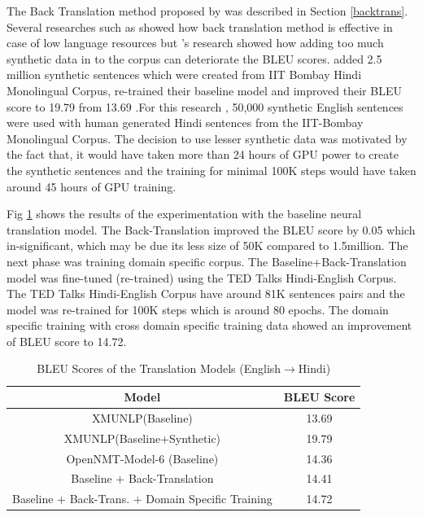 The Back Translation method proposed by \cite{DBLP:journals/corr/SennrichHB15a} was described in Section \ref{backtrans}. Several researches such as \cite{W18-2703} showed how back translation method is effective in case of low language resources but \cite{DBLP:journals/corr/abs-1804-06189}'s research showed how adding too much synthetic data in to the corpus  can deteriorate the BLEU scores.\cite{W17-5707} added 2.5 million synthetic sentences which were created from IIT Bombay Hindi Monolingual Corpus, re-trained their baseline model and improved their BLEU score to 19.79 from 13.69 .For this research , 50,000 synthetic English sentences were used with human generated Hindi sentences from the IIT-Bombay Monolingual Corpus. The decision to use lesser synthetic data was motivated by the fact that, it would have taken more than 24 hours of GPU power to create the synthetic sentences and the training for minimal 100K steps would have taken around 45 hours of GPU training.

Fig \ref{bleutable2} shows the results of the experimentation with the baseline neural translation model. The Back-Translation improved the BLEU score by 0.05 which in-significant, which may be due its less size of 50K compared to 1.5million. The next phase was training domain specific corpus. The Baseline+Back-Translation model was fine-tuned (re-trained) using the TED Talks Hindi-English Corpus. The TED Talks Hindi-English Corpus have around 81K sentences pairs and the model was re-trained for 100K steps which is around 80 epochs. The domain specific training with cross domain specific training data showed an improvement of BLEU score to 14.72.

\begin{table}[h!]
\centering
 \begin{tabular}{ |c|c| } 
  \hline Model & BLEU Score  \\ 
  \hline  XMUNLP(Baseline) &   13.69\\
  XMUNLP(Baseline+Synthetic) &   19.79\\
  \hline  OpenNMT-Model-6 (Baseline) &   14.36\\
  Baseline + Back-Translation & 14.41\\
  Baseline + Back-Trans. + Domain Specific Training & 14.72\\
  \hline
 \end{tabular}
\caption{BLEU Scores of the Translation Models (English$\rightarrow$Hindi)}
\label{bleutable2}
\end{table}

